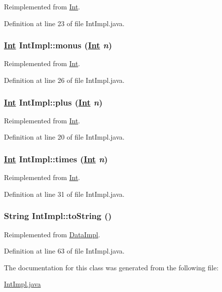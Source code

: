 Reimplemented from \hyperlink{interfaceInt_a2}{Int}.

Definition at line 23 of file Int\-Impl.java.\hypertarget{classIntImpl_a3}{
\subsubsection[monus]{\setlength{\rightskip}{0pt plus 5cm}\hyperlink{interfaceInt}{Int} Int\-Impl::monus (\hyperlink{interfaceInt}{Int} {\em n})}}
\label{classIntImpl_a3}




Reimplemented from \hyperlink{interfaceInt_a3}{Int}.

Definition at line 26 of file Int\-Impl.java.\hypertarget{classIntImpl_a1}{
\subsubsection[plus]{\setlength{\rightskip}{0pt plus 5cm}\hyperlink{interfaceInt}{Int} Int\-Impl::plus (\hyperlink{interfaceInt}{Int} {\em n})}}
\label{classIntImpl_a1}




Reimplemented from \hyperlink{interfaceInt_a1}{Int}.

Definition at line 20 of file Int\-Impl.java.\hypertarget{classIntImpl_a4}{
\subsubsection[times]{\setlength{\rightskip}{0pt plus 5cm}\hyperlink{interfaceInt}{Int} Int\-Impl::times (\hyperlink{interfaceInt}{Int} {\em n})}}
\label{classIntImpl_a4}




Reimplemented from \hyperlink{interfaceInt_a4}{Int}.

Definition at line 31 of file Int\-Impl.java.\hypertarget{classIntImpl_a10}{
\subsubsection[toString]{\setlength{\rightskip}{0pt plus 5cm}String Int\-Impl::to\-String ()}}
\label{classIntImpl_a10}




Reimplemented from \hyperlink{classDataImpl_a6}{Data\-Impl}.

Definition at line 63 of file Int\-Impl.java.

The documentation for this class was generated from the following file:\begin{CompactItemize}
\item 
\hyperlink{IntImpl_8java-source}{Int\-Impl.java}\end{CompactItemize}
